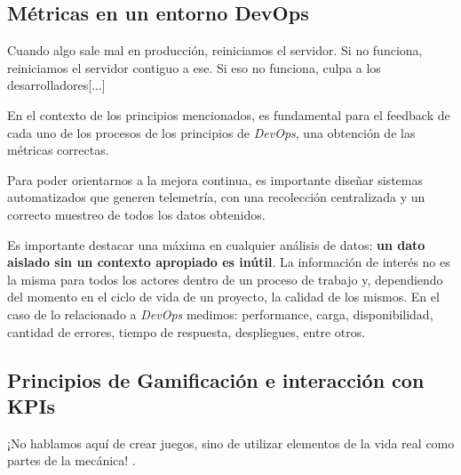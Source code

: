 \documentclass[journal]{IEEEtran}
\begin{document}
\subsection{\textbf{Métricas en un entorno DevOps}} \label{marco-metricas}

\begin{tcolorbox}[colback=gray!10, colframe=black, left=2mm, right=2mm]
    \small %
    \ttfamily %
    \raggedright %
    Cuando algo sale mal en producción, reiniciamos el servidor. Si no funciona, reiniciamos el servidor contiguo a ese. Si eso no funciona, culpa a los desarrolladores[...] \cite{kim2021devops}
\end{tcolorbox}

En el contexto de los principios mencionados, es fundamental para el feedback de cada uno de los procesos de los principios de \textit{DevOps}, una obtención de las métricas correctas. 

Para poder orientarnos a la mejora continua, es importante diseñar sistemas automatizados que generen telemetría, con una recolección centralizada y un correcto muestreo de todos los datos obtenidos\cite[Part IV. 14.]{kim2021devops}.

Es importante destacar una máxima en cualquier análisis de datos: \textbf{un dato aislado sin un contexto apropiado es inútil}. La información de interés no es la misma para todos los actores dentro de un proceso de trabajo y, dependiendo del momento en el ciclo de vida de un proyecto\cite{brunnert2015performance}, la calidad de los mismos. En el caso de lo relacionado a \textit{DevOps} medimos: performance, carga, disponibilidad, cantidad de errores, tiempo de respuesta, despliegues, entre otros.

\subsection{\textbf{Principios de Gamificación e interacción con KPIs}}
\begin{tcolorbox}[colback=gray!10, colframe=black, left=2mm, right=2mm]
    \small %
    \ttfamily %
    \raggedright %
    ¡No hablamos aquí de crear juegos, sino de utilizar elementos de la vida real como partes de la mecánica! \cite{nallar2015estructuraludica}.
\end{tcolorbox}
\end{document}

